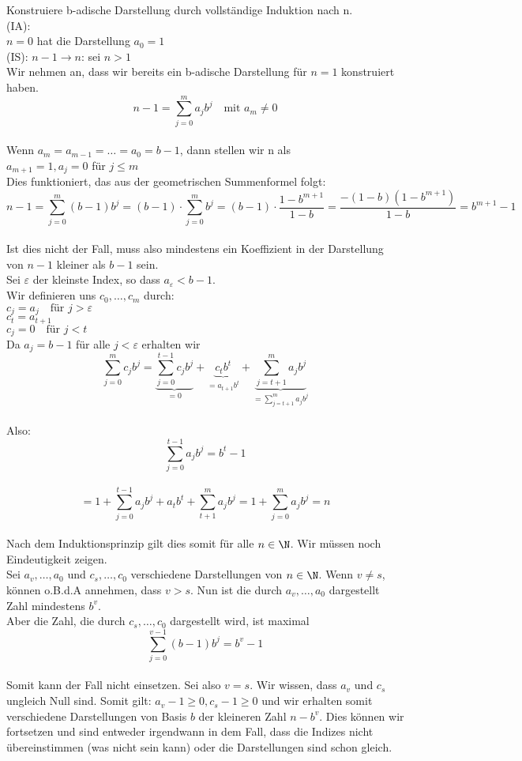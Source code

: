 \documentclass[12pt,a4paper,titlepage,draft]{article}
\begin{document}
	\begin{bew}
		Konstruiere b-adische Darstellung durch vollständige Induktion nach n.\\
		(IA):\\
		\(n = 0\) hat die Darstellung \(a_0 = 1\)\\
		(IS): \(n - 1 \rightarrow n\): sei \(n > 1\)\\
		Wir nehmen an, dass wir bereits ein b-adische Darstellung für \(n = 1\) konstruiert haben.\\
		\[n-1 = \sum_{j=0}^{m} a_jb^j \quad \text{mit } a_m \neq 0\]\\
		Wenn \(a_m = a_{m-1} = \dots = a_0 = b-1\), dann stellen wir n als\\
		\(a_{m+1} = 1, a_j = 0\) für \(j \leq m\)\\
		Dies funktioniert, das aus der geometrischen Summenformel folgt:\\
		\[n-1 = \sum_{j=0}^{m} (b-1)b^j = (b-1) \cdot \sum_{j=0}^{m}b^j = (b-1) \cdot \frac{1- b^{m+1}}{1-b} = \frac{-(1-b)(1-b^{m+1})}{1-b} = b^{m+1}-1\]\\
		Ist dies nicht der Fall, muss also mindestens ein Koeffizient in der Darstellung von \(n-1\) kleiner als \(b-1\) sein.\\
		Sei \(\varepsilon\) der kleinste Index, so dass \(a_{\varepsilon} < b-1\).\\
		Wir definieren uns \(c_0, \dots, c_m\) durch:\\
		\(c_j = a_j \quad \text{für } j > \varepsilon\)\\
		\(c_t = a_{t+1}\)\\
		\(c_j = 0 \quad \text{für } j < t\)\\
		Da \(a_j = b-1\) für alle \(j<\varepsilon\) erhalten wir\\
		\[\sum_{j=0}^{m} c_jb^j = \underbrace{\sum_{j=0}^{t-1} c_jb^j}_{=0} + \underbrace{c_tb^t}_{=a_{t+1}b^t} + \underbrace{\sum_{j=t+1}^{m} a_jb^j}_{=\sum_{j=t+1}^{m} a_jb^j}\]\\
		Also:
		\[\sum_{j=0}^{t-1} a_jb^j = b^t-1\]\\
		\[= 1+\sum_{j=0}^{t-1} a_jb^j + a_tb^t + \sum_{t+1}^{m}a_jb^j = 1+\sum_{j=0}^{m} a_jb^j = n\]\\
		Nach dem Induktionsprinzip gilt dies somit für alle \(n \in \N\). Wir müssen noch Eindeutigkeit zeigen.\\
		Sei \(a_v,\dots, a_0\) und \(c_s,\dots, c_0\) verschiedene Darstellungen von \(n \in \N\). Wenn \(v \neq s\), können o.B.d.A annehmen, dass \(v > s\). Nun ist die durch \(a_v,\dots, a_0\) dargestellt Zahl mindestens \(b^v\).\\
		Aber die Zahl, die durch \(c_s,\dots, c_0\) dargestellt wird, ist maximal\\
		\[\sum_{j=0}^{v-1}(b-1)b^j = b^v - 1\]\\
		Somit kann der Fall nicht einsetzen. Sei also \(v=s\). Wir wissen, dass \(a_v\) und \(c_s\) ungleich Null sind. Somit gilt: \(a_v - 1 \geq 0, c_s - 1 \geq 0\) und wir erhalten somit verschiedene Darstellungen von Basis \(b\) der kleineren Zahl \(n-b^v\). Dies können wir fortsetzen und sind entweder irgendwann in dem Fall, dass die Indizes nicht übereinstimmen (was nicht sein kann) oder die Darstellungen sind schon gleich.
	\end{bew}
\end{document}
